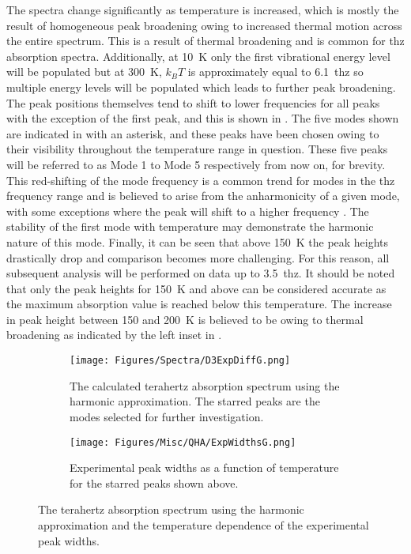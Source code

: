 The spectra change significantly as temperature is increased, which is mostly the result of homogeneous peak broadening owing to increased thermal motion across the entire spectrum. This is a result of thermal broadening and is common for \acrshort{thz} absorption spectra. Additionally, at \SI{10}{K} only the first vibrational energy level will be populated but at \SI{300}{K}, \(k_BT\) is approximately equal to \SI{6.1}{\acrshort{thz}} so multiple energy levels will be populated which leads to further peak broadening. The peak positions themselves tend to shift to lower frequencies for all peaks with the exception of the first peak, and this is shown in . The five modes shown are indicated in  with an asterisk, and these peaks have been chosen owing to their visibility throughout the temperature range in question. These five peaks will be referred to as Mode 1 to Mode 5 respectively from now on, for brevity. This red\nobreakdash-shifting of the mode frequency is a common trend for modes in the \acrshort{thz} frequency range \DIFdelbegin \DIFdel{~}\DIFdelend \cite{Allen2021} and is believed to arise from the anharmonicity of a given mode, with some exceptions where the peak will shift to a higher frequency \DIFdelbegin \DIFdel{~}\DIFdelend \cite{Walther2003}. The stability of the first mode with temperature may demonstrate the harmonic nature of this mode. Finally, it can be seen that above \SI{150}{K} the peak heights drastically drop and comparison becomes more challenging. For this reason, all subsequent analysis will be performed on data up to \SI{3.5}{\acrshort{thz}}. It should be noted that only the peak heights for \SI{150}{K} and above can be considered accurate as the maximum absorption value is reached below this temperature. The increase in peak height between 150 and \SI{200}{K} is believed to be owing to thermal broadening as indicated by the left inset in .

\begin{figure}[ht!]
\centering
\begin{subfigure}{1\textwidth}
\centering
\texttt{[image: Figures/Spectra/D3ExpDiffG.png]}
\caption{The calculated terahertz absorption spectrum using the harmonic approximation. The starred peaks are the modes selected for further investigation.}
\label{fig:starredpeaks}
\end{subfigure}

\begin{subfigure}{1\textwidth}
\centering
\texttt{[image: Figures/Misc/QHA/ExpWidthsG.png]}
\caption{Experimental peak widths as a function of temperature for the starred peaks shown above.}
\label{fig:exppeakshifts}
\end{subfigure}

\captionsetup{font = footnotesize, justification = centering}
\caption[The Terahertz Absorption Spectrum using the Harmonic Approximation and the Temperature Dependence of the Experimental Peak Widths]{The terahertz absorption spectrum using the harmonic approximation and the temperature dependence of the experimental peak widths.}
\label{Fig:d3_exp_mode_temp}
\end{figure}

